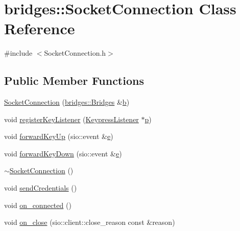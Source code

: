 \hypertarget{classbridges_1_1_socket_connection}{}\section{bridges\+::Socket\+Connection Class Reference}
\label{classbridges_1_1_socket_connection}


{\ttfamily \#include $<$Socket\+Connection.\+h$>$}

\subsection*{Public Member Functions}
\begin{DoxyCompactItemize}
\item 
\mbox{\hyperlink{classbridges_1_1_socket_connection_af8d4af3664ff3d4a2ca52aec5138b05b}{Socket\+Connection}} (\mbox{\hyperlink{classbridges_1_1_bridges}{bridges\+::\+Bridges}} \&\mbox{\hyperlink{namespacebridges_acfb0a4f7877d8f63de3e6862004c50eda92eb5ffee6ae2fec3ad71c777531578f}{b}})
\item 
void \mbox{\hyperlink{classbridges_1_1_socket_connection_a8e865500f57b141aa45b9e5b8fab909b}{register\+Key\+Listener}} (\mbox{\hyperlink{classbridges_1_1_keypress_listener}{Keypress\+Listener}} $\ast$\mbox{\hyperlink{namespacebridges_acfb0a4f7877d8f63de3e6862004c50eda83878c91171338902e0fe0fb97a8c47a}{p}})
\item 
void \mbox{\hyperlink{classbridges_1_1_socket_connection_a245d0bb4a1d2c69ffeaad1406d58ff06}{forward\+Key\+Up}} (sio\+::event \&\mbox{\hyperlink{namespacebridges_acfb0a4f7877d8f63de3e6862004c50edae1671797c52e15f763380b45e841ec32}{e}})
\item 
void \mbox{\hyperlink{classbridges_1_1_socket_connection_a82912828401deb66975d446f476488cc}{forward\+Key\+Down}} (sio\+::event \&\mbox{\hyperlink{namespacebridges_acfb0a4f7877d8f63de3e6862004c50edae1671797c52e15f763380b45e841ec32}{e}})
\item 
\mbox{\hyperlink{classbridges_1_1_socket_connection_aa5810b0c978315c18722e53f33622dfd}{$\sim$\+Socket\+Connection}} ()
\item 
void \mbox{\hyperlink{classbridges_1_1_socket_connection_ae981022aa8b3d4deb2853a7b61bd8f4a}{send\+Credentials}} ()
\item 
void \mbox{\hyperlink{classbridges_1_1_socket_connection_adb217448bb15c30691d0add6a7dcddad}{on\+\_\+connected}} ()
\item 
void \mbox{\hyperlink{classbridges_1_1_socket_connection_a4639457b75c15161950d789bcbb3cffc}{on\+\_\+close}} (sio\+::client\+::close\+\_\+reason const \&reason)

\end{DoxyCompactItemize}
